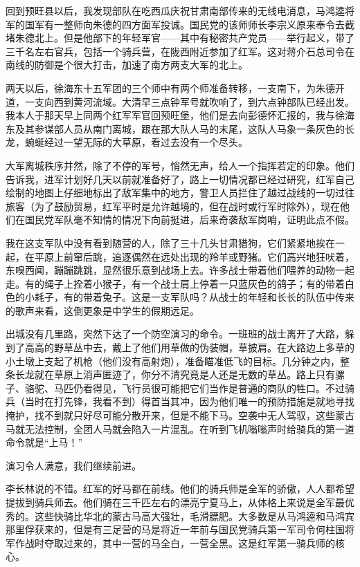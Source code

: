 \documentclass[10pt]{book}
\begin{document}
回到预旺县以后，我发现部队在吃西瓜庆祝甘肃南部传来的无线电消息，马鸿逵将军的国军有一整师向朱德的四方面军投诚。国民党的该师师长李宗义原来奉令去截堵朱德北上。但是他部下的年轻军官——其中有秘密共产党员——举行起义，带了三千名左右官兵，包括一个骑兵营，在陇西附近参加了红军。这对蒋介石总司令在南线的防御是个很大打击，加速了南方两支大军的北上。

两天以后，徐海东十五军团的三个师中有两个师准备转移，一支南下，为朱德开道，一支向西到黄河流域。大清早三点钟军号就吹响了，到六点钟部队已经出发。我本人于那天早上同两个红军军官回预旺堡，他们是去向彭德怀汇报的，我与徐海东及其参谋部人员从南门离城，跟在那大队人马的末尾，这队人马象一条灰色的长龙，蜿蜒经过一望无际的大草原，看过去没有一个尽头。

大军离城秩序井然，除了不停的军号，悄然无声，给人一个指挥若定的印象。他们告诉我，进军计划好几天以前就准备好了，路上一切情况都已经过研究，红军自己绘制的地图上仔细地标出了敌军集中的地方，警卫人员拦住了越过战线的一切过往旅客（为了鼓励贸易，红军平时是允许越境的，但在战时或行军时除外），现在他们在国民党军队毫不知情的情况下向前挺进，后来奇袭敌军岗哨，证明此点不假。

我在这支军队中没有看到随营的人，除了三十几头甘肃猎狗，它们紧紧地挨在一起，在平原上前窜后跳，追逐偶然在远处出现的羚羊或野猪。它们高兴地狂吠着，东嗅西闻，蹦蹦跳跳，显然很乐意到战场上去。许多战士带着他们喂养的动物一起走。有的绳子上拴着小猴子，有一个战士肩上停着一只蓝灰色的鸽子；有的带着白色的小耗子，有的带着兔子。这是一支军队吗？从战士的年轻和长长的队伍中传来的歌声来看，这倒更象是中学生的假期远足。

出城没有几里路，突然下达了一个防空演习的命令。一班班的战士离开了大路，躲到了高高的野草丛中去，戴上了他们用草做的伪装帽，草披肩。在大路边上多草的小土墩上支起了机枪（他们没有高射炮），准备瞄准低飞的目标。几分钟之内，整条长龙就在草原上消声匿迹了，你分不清究竟是人还是无数的草丛。路上只有骡子、骆驼、马匹仍看得见，飞行员很可能把它们当作是普通的商队的牲口。不过骑兵（当时在打先锋，我看不到）得首当其冲，因为他们唯一的预防措施是就地寻找掩护，找不到就只好尽可能分散开来，但是不能下马。空袭中无人驾驭，这些蒙古马就无法控制，全团人马就会陷入一片混乱。在听到飞机嗡嗡声时给骑兵的第一道命令就是“上马！”

演习令人满意，我们继续前进。

李长林说的不错。红军的好马都在前线。他们的骑兵师是全军的骄傲，人人都希望提拔到骑兵师去。他们骑在三千匹左右的漂亮宁夏马上，从体格上来说是全军最优秀的。这些快骑比华北的蒙古马高大强壮，毛滑膘肥。大多数是从马鸿逵和马鸿宾那里俘获来的，但是有三足营的马是将近一年前与国民党骑兵第一军司令何柱国将军作战时夺取过来的，其中一营的马全白，一营全黑。这是红军第一骑兵师的核心。
\end{document}
